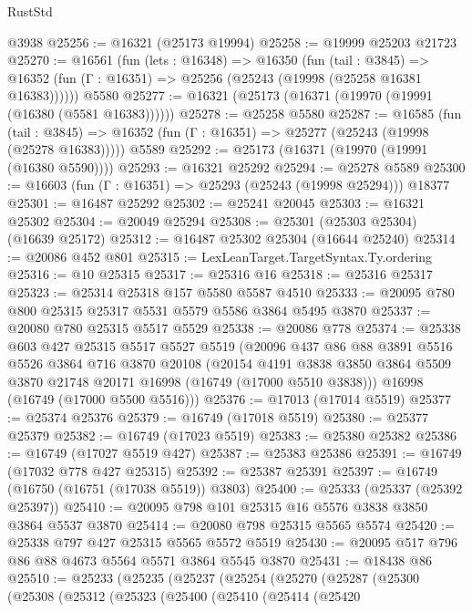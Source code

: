 \begin{lexlean}{RustStd}
\begin{coremodule}
    @3938
@25256 := @16321 (@25173 @19994)
@25258 := @19999 @25203 @21723
@25270 := @16561
    (fun (lets : @16348) =>
    @16350
      (fun (tail : @3845) =>
      @16352 (fun (Γ : @16351) => @25256 (@25243 (@19998 (@25258 @16381 @16383))))))
    @5580
@25277 := @16321 (@25173 (@16371 (@19970 (@19991 (@16380 (@5581 @16383))))))
@25278 := @25258 @5580
@25287 := @16585
    (fun (tail : @3845) => @16352 (fun (Γ : @16351) => @25277 (@25243 (@19998 (@25278 @16383)))))
    @5589
@25292 := @25173 (@16371 (@19970 (@19991 (@16380 @5590))))
@25293 := @16321 @25292
@25294 := @25278 @5589
@25300 := @16603 (fun (Γ : @16351) => @25293 (@25243 (@19998 @25294))) @18377
@25301 := @16487 @25292
@25302 := @25241 @20045
@25303 := @16321 @25302
@25304 := @20049 @25294
@25308 := @25301 (@25303 @25304) (@16639 @25172)
@25312 := @16487 @25302 @25304 (@16644 @25240)
@25314 := @20086 @452 @801
@25315 := LexLeanTarget.TargetSyntax.Ty.ordering
@25316 := @10 @25315
@25317 := @25316 @16
@25318 := @25316 @25317
@25323 := @25314 @25318 @157 @5580 @5587 @4510
@25333 := @20095 @780 @800 @25315 @25317 @5531 @5579 @5586 @3864 @5495 @3870
@25337 := @20080 @780 @25315 @5517 @5529
@25338 := @20086 @778
@25374 := @25338
    @603
    @427
    @25315
    @5517
    @5527
    @5519
    (@20096
      @437
      @86
      @88
      @3891
      @5516
      @5526
      @3864
      @716
      @3870
      @20108
      (@20154
        @4191
        @3838
        @3850
        @3864
        @5509
        @3870
        @21748
        @20171
        @16998
        (@16749 (@17000 @5510 @3838)))
      @16998
      (@16749 (@17000 @5500 @5516)))
@25376 := @17013 (@17014 @5519)
@25377 := @25374 @25376
@25379 := @16749 (@17018 @5519)
@25380 := @25377 @25379
@25382 := @16749 (@17023 @5519)
@25383 := @25380 @25382
@25386 := @16749 (@17027 @5519 @427)
@25387 := @25383 @25386
@25391 := @16749 (@17032 @778 @427 @25315)
@25392 := @25387 @25391
@25397 := @16749 (@16750 (@16751 (@17038 @5519)) @3803)
@25400 := @25333 (@25337 (@25392 @25397))
@25410 := @20095 @798 @101 @25315 @16 @5576 @3838 @3850 @3864 @5537 @3870
@25414 := @20080 @798 @25315 @5565 @5574
@25420 := @25338 @797 @427 @25315 @5565 @5572 @5519
@25430 := @20095 @517 @796 @86 @88 @4673 @5564 @5571 @3864 @5545 @3870
@25431 := @18438 @86
@25510 := @25233
    (@25235
      (@25237
        (@25254
          (@25270
            (@25287
              (@25300
                (@25308
                  (@25312
                    (@25323
                      (@25400
                        (@25410
                          (@25414
                            (@25420

\end{coremodule}
\end{lexlean}
